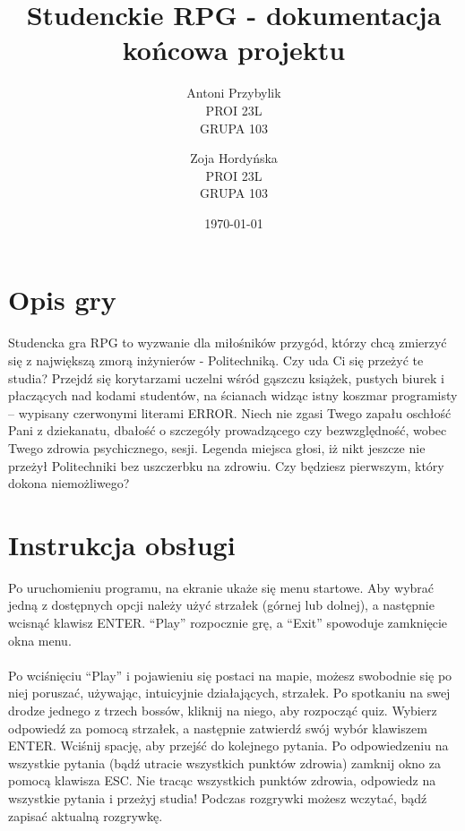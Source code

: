 \documentclass[12pt, titlepage]{article}
\author{Antoni Przybylik \\ PROI 23L \\ GRUPA 103 \and
	Zoja Hordyńska \\ PROI 23L \\ GRUPA 103}
\date{\today}
\title{Studenckie RPG - dokumentacja końcowa projektu}
\begin{document}
\maketitle
\justifying



\hypersetup{
	colorlinks=true,
	linkcolor=blue,
}

\lstset{style=listingstyle}

\section{Opis gry}
Studencka gra RPG to wyzwanie dla miłośników przygód, którzy chcą zmierzyć się z największą zmorą inżynierów - Politechniką. Czy uda Ci się przeżyć te studia? Przejdź się korytarzami uczelni wśród gąszczu książek, pustych biurek i płaczących nad kodami studentów, na ścianach widząc istny koszmar programisty – wypisany czerwonymi literami ERROR. Niech nie zgasi Twego zapału oschłość Pani z dziekanatu, dbałość o szczegóły prowadzącego czy bezwzględność, wobec Twego zdrowia psychicznego, sesji. Legenda miejsca głosi, iż nikt jeszcze nie przeżył Politechniki bez uszczerbku na zdrowiu. Czy będziesz pierwszym, który dokona niemożliwego? 

\section{Instrukcja obsługi}
Po uruchomieniu programu, na ekranie ukaże się menu startowe. Aby wybrać jedną z dostępnych opcji należy użyć strzałek (górnej lub dolnej), a następnie wcisnąć klawisz ENTER. “Play” rozpocznie grę, a “Exit” spowoduje zamknięcie okna menu.  
\\~\\
Po wciśnięciu “Play” i pojawieniu się postaci na mapie, możesz swobodnie się po niej poruszać, używając, intuicyjnie działających, strzałek. Po spotkaniu na swej drodze jednego z trzech bossów, kliknij na niego, aby rozpocząć quiz. Wybierz odpowiedź za pomocą strzałek, a następnie zatwierdź swój wybór klawiszem ENTER. Wciśnij spację, aby przejść do kolejnego pytania. Po odpowiedzeniu na wszystkie pytania (bądź utracie wszystkich punktów zdrowia) zamknij okno za pomocą klawisza ESC. Nie tracąc wszystkich punktów zdrowia, odpowiedz na wszystkie pytania i przeżyj studia! Podczas rozgrywki możesz wczytać, bądź zapisać aktualną rozgrywkę.
\end{document}
